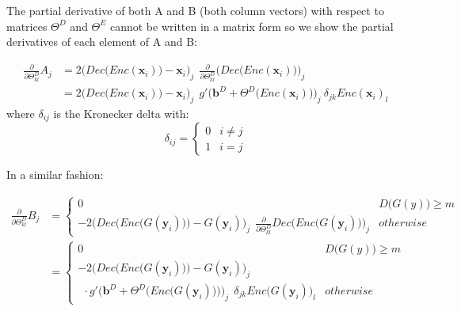 The partial derivative of both A and B (both column vectors) with respect to matrices $\Theta^{D}$ and $\Theta^{E}$ cannot be written in a matrix form so we show the partial derivatives of each element of A and B:

\[
\begin{split}
    \frac{\partial}{\partial \Theta^{D}_{kl}} A_{j} 
    & = 2 \Big(Dec\big(Enc(\mathbf{x}_i)\big) - \mathbf{x}_{i}\Big)_{j} \:\: \frac{\partial}{\partial \Theta^{D}_{kl}}  \Big(Dec\big(Enc(\mathbf{x}_i)\big)\Big)_{j} \\[10pt]
    & = 2 \Big(Dec\big(Enc(\mathbf{x}_i)\big) - \mathbf{x}_{i}\Big)_{j} \:\: g'\Big(\mathbf{b}^{D} + \Theta^{D}\big(Enc(\mathbf{x}_{i})\big)\Big)_{j}
    \: \delta_{jk} Enc(\mathbf{x}_{i})_{l}
\end{split}
\]
where $\delta_{ij}$ is the Kronecker delta with:
\[
\delta_{ij} = 
    \begin{cases}
    0 & i \neq j\\
    1 & i = j
    \end{cases}
\]

\vspace{10pt}

In a similar fashion:

\[
    \begin{split}
        \frac{\partial}{\partial \Theta^{D}_{kl}} B_{j}
        & =
        \begin{cases}
            0 & D\big(G(y)\big) \geq m \\
            - 2 \bigg(Dec\Big(Enc\big(G(\mathbf{y}_i)\big)\Big) - G(\mathbf{y}_{i})\bigg)_{j} \:\: \frac{\partial}{\partial \Theta^{D}_{kl}} Dec\Big(Enc\big(G(\mathbf{y}_i)\big)\Big)_{j} & otherwise
        \end{cases} \\[10pt]
        & =
        \begin{cases}
            0 & D\big(G(y)\big) \geq m \\
            - 2 \bigg(Dec\Big(Enc\big(G(\mathbf{y}_i)\big)\Big) - G(\mathbf{y}_{i})\bigg)_{j}\\
            \:\: \cdot g'\bigg(\mathbf{b}^{D} + \Theta^{D}\Big(Enc\big(G(\mathbf{y}_{i})\big)\Big)\bigg)_{j} \:\: \delta_{jk} Enc\big(G(\mathbf{y}_{i})\big)_{l} & otherwise
        \end{cases}
    \end{split}
\]

\vspace{10pt}

